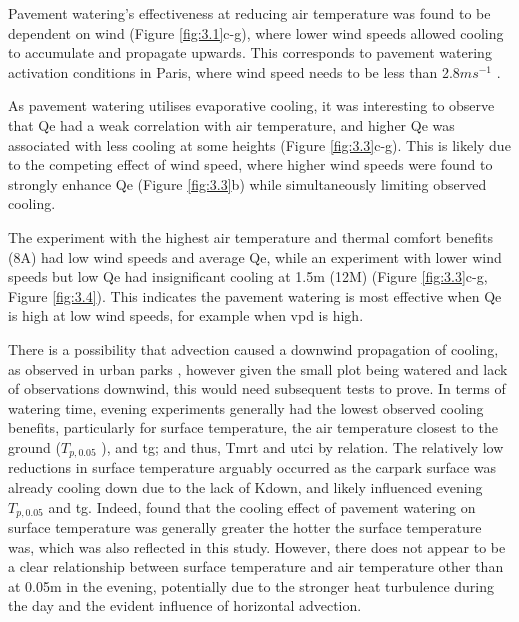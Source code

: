 \documentclass[final,3p,times,authoryear]{elsarticle}
\begin{document}
Pavement watering's effectiveness at reducing air temperature was found to be
dependent on wind (Figure \ref{fig:3.1}c-g), where lower wind speeds allowed cooling to
accumulate and propagate upwards. This corresponds to pavement watering activation
conditions in Paris, where wind speed needs to be less than 2.8$ms^{-1}$ \citep{Hendel2015a}.

As pavement watering utilises evaporative cooling, it was interesting to observe that \gls{Qe} had a weak correlation with air temperature, and higher \gls{Qe} was associated with less cooling at some heights (Figure \ref{fig:3.3}c-g). This is likely due to the competing effect of wind speed, where higher wind speeds were found to strongly enhance \gls{Qe} (Figure \ref{fig:3.3}b) while simultaneously limiting observed cooling.

The experiment with the highest air temperature and thermal comfort benefits (8A) had low wind speeds and average \gls{Qe}, while an experiment with lower wind speeds but low \gls{Qe} had insignificant cooling at 1.5m (12M) (Figure \ref{fig:3.3}c-g, Figure \ref{fig:3.4}). This indicates the pavement watering is most effective when \gls{Qe} is high at low wind speeds, for example when \gls{vpd} is high.

There is a possibility that advection caused a downwind propagation of cooling, as observed in urban parks \citep{Motazedian2020}, however given the small plot being watered and lack of observations downwind, this would need subsequent tests to prove. In terms of watering time, evening experiments generally had the lowest observed cooling benefits, particularly for surface temperature, the air temperature closest to the ground ($T_{p,0.05}$ ), and \gls{tg}; and thus, \gls{Tmrt} and \gls{utci} by relation. The relatively low reductions in surface temperature arguably occurred as the carpark surface was already cooling down due to the lack of \gls{Kdown}, and likely influenced evening $T_{p,0.05}$ and \gls{tg}. Indeed, \cite{Takebayashi2021} found that the cooling effect of pavement watering on surface temperature was generally greater the hotter the surface temperature was, which was also reflected in this study. However, there does not appear to be a clear relationship between surface temperature and air temperature other than at 0.05m in the evening, potentially due to the stronger heat turbulence during the day and the evident influence of horizontal advection.
\end{document}
